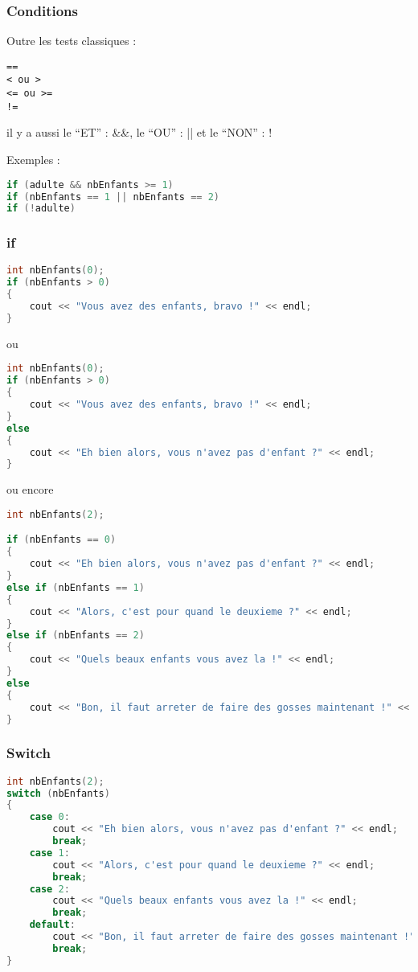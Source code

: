 \documentclass[a4paper,twoside]{article}
\begin{document}
\subsubsection{Conditions}
Outre les tests classiques : 
\begin{verbatim}
==
< ou >
<= ou >=
!=
\end{verbatim}
il y a aussi le ``ET'' : \&\&, le ``OU'' : || et le ``NON'' : !

Exemples : 
\begin{lstlisting}[language=C++]
if (adulte && nbEnfants >= 1)
if (nbEnfants == 1 || nbEnfants == 2)
if (!adulte)
\end{lstlisting}

\subsubsection{if}
\begin{lstlisting}[language=C++]
int nbEnfants(0);
if (nbEnfants > 0)
{
    cout << "Vous avez des enfants, bravo !" << endl;
}
\end{lstlisting}
ou
\begin{lstlisting}[language=C++]
int nbEnfants(0);
if (nbEnfants > 0)
{
    cout << "Vous avez des enfants, bravo !" << endl;
}
else
{
    cout << "Eh bien alors, vous n'avez pas d'enfant ?" << endl;
}
\end{lstlisting}
ou encore 
\begin{lstlisting}[language=C++]
int nbEnfants(2);

if (nbEnfants == 0)
{
    cout << "Eh bien alors, vous n'avez pas d'enfant ?" << endl;
}
else if (nbEnfants == 1)
{
    cout << "Alors, c'est pour quand le deuxieme ?" << endl;
}
else if (nbEnfants == 2)
{
    cout << "Quels beaux enfants vous avez la !" << endl;
}
else
{
    cout << "Bon, il faut arreter de faire des gosses maintenant !" << endl;
}
\end{lstlisting}

\subsubsection{Switch}
\begin{lstlisting}[language=C++]
int nbEnfants(2);
switch (nbEnfants)
{
    case 0:
        cout << "Eh bien alors, vous n'avez pas d'enfant ?" << endl;
        break;
    case 1:
        cout << "Alors, c'est pour quand le deuxieme ?" << endl;
        break;
    case 2:
        cout << "Quels beaux enfants vous avez la !" << endl;
        break;
    default:
        cout << "Bon, il faut arreter de faire des gosses maintenant !" << endl;
        break;
}
\end{lstlisting}
\end{document}
